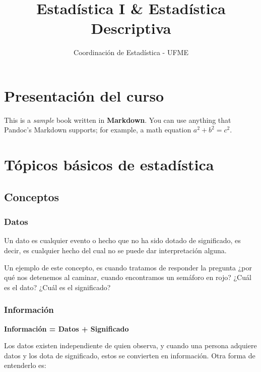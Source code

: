 \documentclass[
]{book}
\title{Estadística I \& Estadística Descriptiva}
\author{Coordinación de Estadística - UFME}
\date{}
\theoremstyle{definition}
\theoremstyle{definition}
\theoremstyle{definition}
\theoremstyle{definition}
\theoremstyle{remark}
\begin{document}
\maketitle

{
\setcounter{tocdepth}{1}
\tableofcontents
}
\hypertarget{presentaciuxf3n-del-curso}{%
\chapter*{Presentación del curso}\label{presentaciuxf3n-del-curso}}

This is a \emph{sample} book written in \textbf{Markdown}. You can use anything that Pandoc's Markdown supports; for example, a math equation \(a^2 + b^2 = c^2\).

\hypertarget{tuxf3picos-buxe1sicos-de-estaduxedstica}{%
\chapter{Tópicos básicos de estadística}\label{tuxf3picos-buxe1sicos-de-estaduxedstica}}

\hypertarget{conceptos}{%
\section{Conceptos}\label{conceptos}}

\hypertarget{datos}{%
\subsection*{Datos}\label{datos}}

Un dato es cualquier evento o hecho que no ha sido dotado de significado, es decir, es cualquier hecho del cual no se puede dar interpretación alguna.

Un ejemplo de este concepto, es cuando tratamos de responder la pregunta ¿por qué nos detenemos al caminar, cuando encontramos un semáforo en rojo? ¿Cuál es el dato? ¿Cuál es el significado?

\hypertarget{informaciuxf3n}{%
\subsection*{Información}\label{informaciuxf3n}}

\textbf{Información = Datos + Significado}

Los datos existen independiente de quien observa, y cuando una persona adquiere datos y los dota de significado, estos se convierten en información. Otra forma de entenderlo es:
\end{document}
